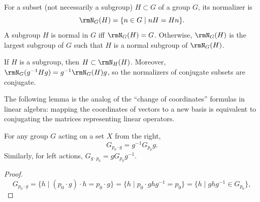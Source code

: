 \begin{defn}[Normalizer]
For a subset (not necessarily a subgroup) $H\subset G$ of a group $G$, its normalizer is 
\[\rmN_G(H)=\{n\in G\mid nH=Hn\}.\]
A subgroup $H$ is normal in $G$ iff $\rmN_G(H)=G$. Otherwise, $\rmN_G(H)$ is the largest subgroup of $G$ such that $H$ is a normal subgroup of $\rmN_G(H)$.
\end{defn}
\begin{rem}
    If $H$ is a subgroup, then $H\subset \rmN_H(H)$. Moreover, $\rmN_G(g^{-1}Hg)=g^{-1}\rmN_G(H)g$, so the normalizers of conjugate subsets are conjugate.
\end{rem}

The following lemma is the analog of the ``change of coordinates'' formulas in linear algebra: mapping the coordinates of vectors to a new basis is equivalent to conjugating the matrices representing linear operators.
\begin{lem} For any group $G$ acting on a set $X$ from the right,
\[\boxed{G_{p_0\cdot g}=g^{-1}G_{p_0}g.}\label{conjugate stabilizers}\]
Similarly, for left actions, $G_{g\cdot p_0}=gG_{p_0}g^{-1}$.
\end{lem}
\begin{proof}
    \[
        G_{p_0\cdot g}=\{h\mid (p_0\cdot g)\cdot h=p_0\cdot g\}=\{h\mid p_0\cdot ghg^{-1}=p_0\}=\{h\mid ghg^{-1}\in G_{p_0}\},
    \]
\end{proof}

